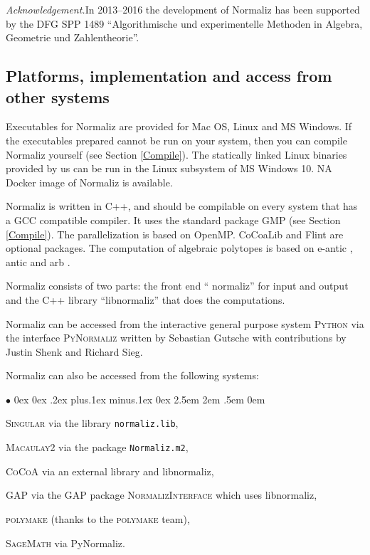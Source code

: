 \documentclass[12pt,a4paper]{scrartcl}
\newcommand{\stdli}{ \topsep0ex \partopsep0ex %
\parsep.2ex plus.1ex minus.1ex \itemsep0ex%
\leftmargin2.5em \labelwidth2em \labelsep.5em \rightmargin0em}%
\renewenvironment{itemize}{\begin{list}{{$\bullet$}}{\stdli}}{\end{list}}
\theoremstyle{definition}
\def\ttt{\texttt}
\begin{document}
\emph{Acknowledgement.}\enspace In 2013--2016 the development of Normaliz has been supported by the DFG SPP 1489  ``Algorithmische und ex\-pe\-rimentelle Methoden in Algebra, Geometrie und Zahlentheorie''.

\subsection{Platforms, implementation and access from other systems}

Executables for Normaliz are provided for Mac OS, Linux and MS Windows. If the executables prepared cannot be run on your system, then you can  compile Normaliz yourself (see Section \ref{Compile}). The statically linked Linux binaries provided by us  can be run in the Linux subsystem of MS Windows 10. NA Docker image of Normaliz is available.

Normaliz is written in C++, and should be compilable on every system that has a GCC compatible compiler. It uses the standard package GMP (see Section \ref{Compile}). The parallelization is based on OpenMP. CoCoaLib \cite{CoCoA} and Flint \cite{Flint} are optional packages. The computation of algebraic polytopes is based on e-antic \cite{e-antic}, antic \cite{antic}and arb \cite{arb}.

Normaliz consists of two parts: the front end `` normaliz'' for input and output and the C++ library ``libnormaliz'' that does the computations.

Normaliz can be accessed from the interactive general purpose system \textsc{Python} via the interface \textsc{PyNormaliz} written by Sebastian Gutsche with contributions by Justin Shenk and Richard Sieg.

Normaliz can also be accessed from the following systems:
\begin{itemize}
	\item \textsc{Singular} via the library \ttt{normaliz.lib},
	\item \textsc{Macaulay2} via the package \ttt{Normaliz.m2},
	\item \textsc{CoCoA} via an external library and libnormaliz,
	\item \textsc{GAP} via the GAP package \textsc{NormalizInterface} \cite{GAP-NmzInterface} which uses libnormaliz,
	\item \textsc{polymake} (thanks to the \textsc{polymake}
	team),
	\item \textsc{SageMath} via PyNormaliz.
\end{itemize}
\end{document}
